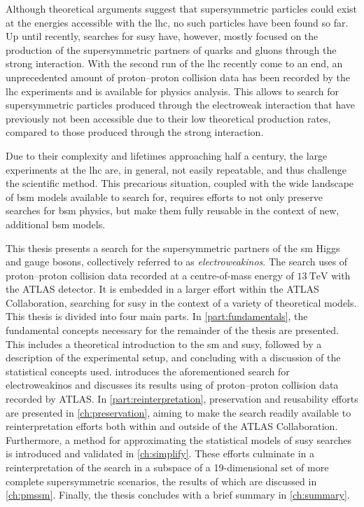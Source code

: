 Although theoretical arguments suggest that supersymmetric particles could exist at the energies accessible with the \gls{lhc}, no such particles have been found so far.
Up until recently, searches for \gls{susy} have, however, mostly focused on the production of the supersymmetric partners of quarks and gluons through the strong interaction.
With the second run of the \gls{lhc} recently come to an end, an unprecedented amount of proton--proton collision data has been recorded by the \gls{lhc} experiments and is available for physics analysis.
This allows to search for supersymmetric particles produced through the electroweak interaction that have previously not been accessible due to their low theoretical production rates, compared to those produced through the strong interaction.

Due to their complexity and lifetimes approaching half a century, the large experiments at the \gls{lhc} are, in general, not easily repeatable, and thus challenge the scientific method.
This precarious situation, coupled with the wide landscape of \gls{bsm} models available to search for, requires efforts to not only preserve searches for \gls{bsm} physics, but make them fully reusable in the context of new, additional \gls{bsm} models. 

This thesis presents a search for the supersymmetric partners of the \gls{sm} Higgs and gauge bosons, collectively referred to as \textit{electroweakinos}. The search uses \onethirtynineifb of proton--proton collision data recorded at a centre-of-mass energy of $\SI{13}{\TeV}$ with the ATLAS detector.
It is embedded in a larger effort within the ATLAS Collaboration, searching for \gls{susy} in the context of a variety of theoretical models.
This thesis is divided into four main parts.
In \cref{part:fundamentals}, the fundamental concepts necessary for the remainder of the thesis are presented.
This includes a theoretical introduction to the \gls{sm} and \gls{susy}, followed by a description of the experimental setup, and concluding with a discussion of the statistical concepts used.
 introduces the aforementioned search for electroweakinos and discusses its results using \onethirtynineifb of proton--proton collision data recorded by ATLAS.
In \cref{part:reinterpretation}, preservation and reusability efforts are presented in \cref{ch:preservation}, aiming to make the search readily available to reinterpretation efforts both within and outside of the ATLAS Collaboration.
Furthermore, a method for approximating the statistical models of \gls{susy} searches is introduced and validated in \cref{ch:simplify}. These efforts culminate in a reinterpretation of the search in a subspace of a 19-dimensional set of more complete supersymmetric scenarios, the results of which are discussed in \cref{ch:pmssm}.
Finally, the thesis concludes with a brief summary in \cref{ch:summary}.
